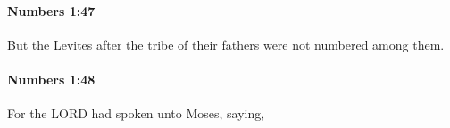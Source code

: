 		\paragraph{Numbers 1:47} %
			\label{NUMBERS-1-47}

			But the Levites after the tribe of their fathers were not numbered among them.


		\paragraph{Numbers 1:48} %
			\label{NUMBERS-1-48}

			For the LORD had spoken unto Moses, saying,


